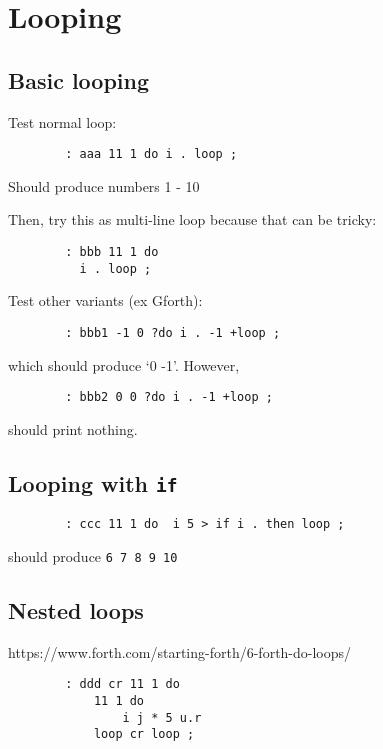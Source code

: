 \section{Looping}

\subsection{Basic looping}

Test normal loop:
\begin{lstlisting}
        : aaa 11 1 do i . loop ;        
\end{lstlisting}

Should produce numbers 1 - 10

Then, try this as multi-line loop because that can be tricky:
\begin{lstlisting}
        : bbb 11 1 do 
          i . loop ; 
\end{lstlisting}

Test other variants (ex Gforth):

\begin{lstlisting}
        : bbb1 -1 0 ?do i . -1 +loop ;
\end{lstlisting}

which should produce `0 -1'. However, 

\begin{lstlisting}
        : bbb2 0 0 ?do i . -1 +loop ;
\end{lstlisting}

should print nothing.


\subsection{Looping with \texttt{if}}

\begin{lstlisting}
        : ccc 11 1 do  i 5 > if i . then loop ; 
\end{lstlisting}

should produce \texttt{6 7 8 9 10}


\subsection{Nested loops}

https://www.forth.com/starting-forth/6-forth-do-loops/

\begin{lstlisting}
        : ddd cr 11 1 do
            11 1 do 
                i j * 5 u.r 
            loop cr loop ;
\end{lstlisting}

